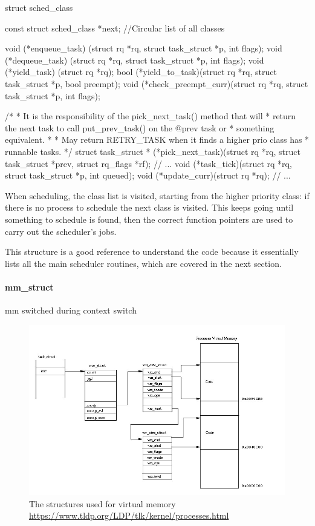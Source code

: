 \begin{code}
struct sched_class {
	const struct sched_class *next; //Circular list of all classes

	void (*enqueue_task) (struct rq *rq, struct task_struct *p, int flags);
	void (*dequeue_task) (struct rq *rq, struct task_struct *p, int flags);
	void (*yield_task)   (struct rq *rq);
	bool (*yield_to_task)(struct rq *rq, struct task_struct *p, bool preempt);
	void (*check_preempt_curr)(struct rq *rq, struct task_struct *p, int flags);

	/*
	 * It is the responsibility of the pick_next_task() method that will
	 * return the next task to call put_prev_task() on the @prev task or
	 * something equivalent.
	 *
	 * May return RETRY_TASK when it finds a higher prio class has 
	 * runnable tasks.
	 */
	struct task_struct * (*pick_next_task)(struct rq *rq,
					       struct task_struct *prev,
					       struct rq_flags *rf);
    // ...
    void (*task_tick)(struct rq *rq, struct task_struct *p, int queued);
    void (*update_curr)(struct rq *rq);
    // ...
}
\end{code}
When scheduling, the class list is visited, starting from the higher priority class: if there is no process to schedule the next class is visited. This keeps going until something to schedule is found, then the correct function pointers are used to carry out the scheduler's jobs. 

This structure is a good reference to understand the code because it essentially lists all the main scheduler routines, which are covered in the next section.

\paragraph{mm\_struct} %
 mm switched during context switch

\begin{figure}[ht]
\includegraphics[width=\textwidth]{images/mm.jpg}
\caption{The structures used for virtual memory \url{https://www.tldp.org/LDP/tlk/kernel/processes.html}}
\label{img:mm}
\end{figure}

